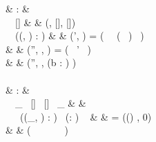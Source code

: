 \begin{figure}[H]
\begin{functioncode}
{                                          &   :           & \State \rightarrow \Declarations \rightarrow \Optiontype{\State \times \Env \times \List{\Block}} \\
 \ \Statevar \ []                         &   \triangleq  & (\Statevar, [], []) \\
 \ \Statevar \ ((\tau, \Idvar) : \Dclvar) &   \triangleq  & \pseudolet (\Statevar', \Blockvar) = ( \ \Statevar \ ( \ \tau) \ \false)\errbind \ \pseudoin \\
                                                                &               & \quad \pseudolet (\Statevar'', \Envvar, ) = ( \ \Statevar' \ \Dclvar)\errbind \ \pseudoin \\
                                                                &               & \quad \quad (\Statevar'', \Envvar\set{\Idvar \leftarrow \Blockvar}, (b : ) ) \\~\\

                                         &   :           & \Mem \rightarrow \Env \rightarrow \Declarations \rightarrow \List{\Val} \rightarrow \Scopeid \rightarrow \Mem \\
 \ \Memvar \ \_ \ [] \ [] \ \_           &   \triangleq  & \Memvar \\
 \ \Memvar \ \Envvar \ ((\_, \Idvar) : \Dclvar) \ (\Valvar : ) \ \Scopeidvar
                                                                &   \triangleq  & \pseudolet \Simplelocvar = (\Envvar(\Idvar) , 0) \ \pseudoin \\
                                                                &               & \quad \pseudoin ( \ \Memvar\set{\Simplelocvar \leftarrow \Valvar} \ \Envvar \ \Dclvar \  \ \Scopeidvar) \\~\\

}
\end{functioncode}
\end{figure}
